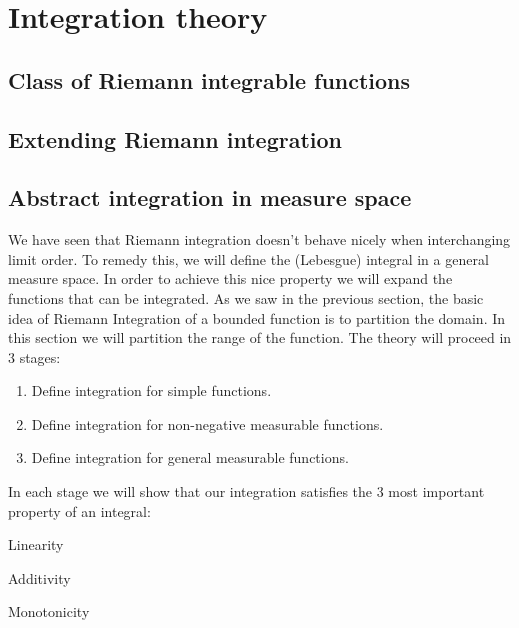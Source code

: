 \chapter{Integration theory}
\section{Class of Riemann integrable functions}
\section{Extending Riemann integration}
\section{Abstract integration in measure space}
We have seen that Riemann integration doesn't behave nicely when interchanging limit order. To remedy this, we
will define the (Lebesgue) integral in a general measure space. In order to achieve this nice property we will
expand the functions that can be integrated. As we saw in the previous section, the basic idea of Riemann
Integration of a bounded function is to partition the domain. In this section we will partition the range of
the function. The theory will proceed in $3$ stages:
\begin{enumerate}
    \item
	Define integration for simple functions.
    \item
	Define integration for non-negative measurable functions.
    \item
	Define integration for general measurable functions.
\end{enumerate}
In each stage we will show that our integration satisfies the $3$ most important property of an integral:
\begin{properties}
\item
    Linearity
\item
    Additivity
\item
    Monotonicity
\end{properties}

